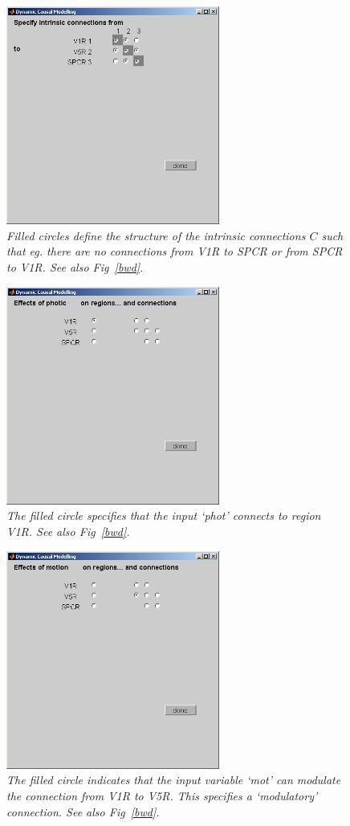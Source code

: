 \begin{figure}[ht]
\begin{center}
\includegraphics[width=70mm]{dcm/Fig4}
\caption{\em Filled circles define the structure of the intrinsic connections $C$ such that eg. there are no connections from V1R to SPCR or from SPCR to V1R. See also Fig~\ref{bwd}.\label{fig4}}
\end{center}
\end{figure}
\begin{figure}[ht]
\begin{center}
\includegraphics[width=70mm]{dcm/Fig5}
\caption{\em The filled circle specifies that the input `phot' connects to region V1R. See also Fig~\ref{bwd}.\label{fig5}}
\end{center}
\end{figure}
\begin{figure}[ht]
\begin{center}
\includegraphics[width=70mm]{dcm/Fig6}
\caption{\em The filled circle indicates that the input variable `mot' can modulate the connection from V1R to V5R. This specifies a `modulatory' connection. See also Fig~\ref{bwd}.\label{fig6}}
\end{center}
\end{figure}
